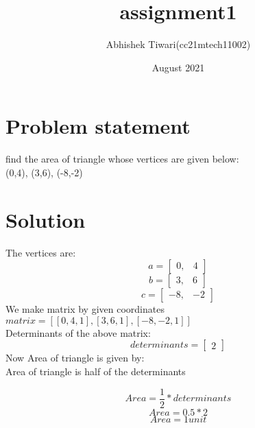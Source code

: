 \documentclass{article}
\title{assignment1}
\author{Abhishek Tiwari(cc21mtech11002) }
\date{August 2021}
\begin{document}
\maketitle

\section{Problem statement}
find the area of triangle whose vertices are given below:\\ (0,4), (3,6), (-8,-2)

\section{Solution}

The vertices are:
 $$a= \begin{bmatrix} 
     0, &  4 
  \end{bmatrix}$$
 $$b= \begin{bmatrix} 
    3, &  6 
  \end{bmatrix}$$
 $$c =\begin{bmatrix} 
    -8, &  -2 
  \end{bmatrix}$$
  We make matrix by given coordinates\\ 
  $ matrix = [[0,4, 1],
              [3, 6, 1],
              [-8, -2, 1]]$\\
  Determinants of the above matrix:\\
  $$ determinants=  \begin{bmatrix}
      2 
  \end{bmatrix}$$
  Now Area of triangle is given by:\\
  Area of triangle is half of the determinants
  
  $$Area= \frac{1}{2}* determinants $$
$$Area =0.5* 2 $$
$$Area = 1 unit $$
\end{document}
